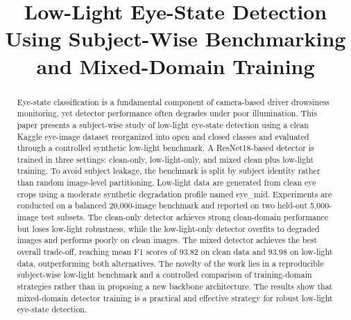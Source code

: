 \documentclass[conference]{IEEEtran}
\begin{document}
\setlength{\textfloatsep}{9pt plus 1.0pt minus 2.0pt}
\setlength{\floatsep}{8pt plus 1.0pt minus 2.0pt}
\setlength{\intextsep}{8pt plus 1.0pt minus 2.0pt}
\setlength{\abovecaptionskip}{5pt}
\setlength{\belowcaptionskip}{0pt}
\renewcommand{\arraystretch}{1.08}

\title{Low-Light Eye-State Detection Using Subject-Wise Benchmarking and Mixed-Domain Training}

\author{
}

\maketitle

\begin{abstract}
Eye-state classification is a fundamental component of camera-based driver drowsiness monitoring, yet detector performance often degrades under poor illumination. This paper presents a subject-wise study of low-light eye-state detection using a clean Kaggle eye-image dataset reorganized into open and closed classes and evaluated through a controlled synthetic low-light benchmark. A ResNet18-based detector is trained in three settings: clean-only, low-light-only, and mixed clean plus low-light training. To avoid subject leakage, the benchmark is split by subject identity rather than random image-level partitioning. Low-light data are generated from clean eye crops using a moderate synthetic degradation profile named eye\_mid. Experiments are conducted on a balanced 20,000-image benchmark and reported on two held-out 5,000-image test subsets. The clean-only detector achieves strong clean-domain performance but loses low-light robustness, while the low-light-only detector overfits to degraded images and performs poorly on clean images. The mixed detector achieves the best overall trade-off, reaching mean F1 scores of 93.82 on clean data and 93.98 on low-light data, outperforming both alternatives. The novelty of the work lies in a reproducible subject-wise low-light benchmark and a controlled comparison of training-domain strategies rather than in proposing a new backbone architecture. The results show that mixed-domain detector training is a practical and effective strategy for robust low-light eye-state detection.
\end{abstract}
\end{document}
